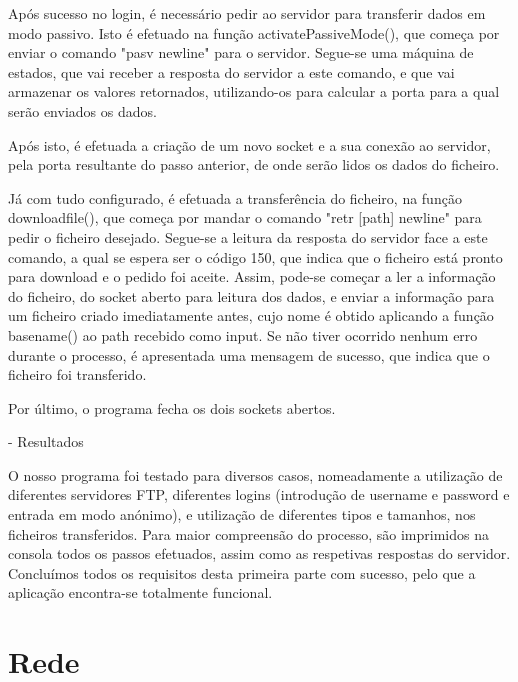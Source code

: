 \documentclass[article, a4paper, 11pt, oneside]{memoir}
\begin{document}
Após sucesso no login, é necessário pedir ao servidor para transferir dados em modo passivo. Isto é efetuado na função activatePassiveMode(), que começa por enviar o comando "pasv newline" para o servidor.
Segue-se uma máquina de estados, que vai receber a resposta do servidor a este comando, e que vai armazenar os valores retornados, utilizando-os para calcular a porta para a qual serão enviados os dados. 

Após isto, é efetuada a criação de um novo socket e a sua conexão ao servidor, pela porta resultante do passo anterior, de onde serão lidos os dados do ficheiro.

Já com tudo configurado, é efetuada a transferência do ficheiro, na função download\textunderscore file(), que começa por mandar
o comando "retr [path] newline" para pedir o ficheiro desejado. Segue-se a leitura da resposta do servidor face a este comando,
a qual se espera ser o código 150, que indica que o ficheiro está pronto para download e o pedido foi aceite. 
Assim, pode-se começar a ler a informação do ficheiro, do socket aberto para leitura dos dados, e enviar a informação para um ficheiro criado imediatamente antes,
cujo nome é obtido aplicando a função basename() ao path recebido como input. Se não tiver ocorrido nenhum erro durante o processo, é apresentada uma mensagem de sucesso,
que indica que o ficheiro foi transferido. 

Por último, o programa fecha os dois sockets abertos.

- Resultados

O nosso programa foi testado para diversos casos, nomeadamente a utilização de diferentes servidores FTP,
diferentes logins (introdução de username e password e entrada em modo anónimo), e utilização de diferentes tipos e tamanhos, nos ficheiros transferidos.
Para maior compreensão do processo, são imprimidos na consola todos os passos efetuados, assim como as respetivas respostas do servidor.
Concluímos todos os requisitos desta primeira parte com sucesso, pelo que a aplicação encontra-se totalmente funcional.

\chapter[Rede][Rede]{Rede} \label{\thechapter}
\end{document}
